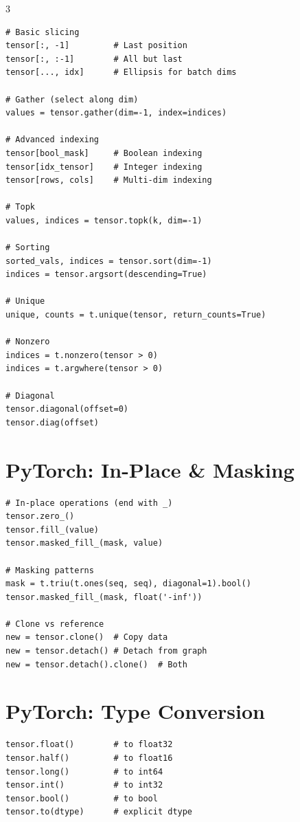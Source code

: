 \documentclass[10pt,a4paper,landscape]{article}
\begin{document}
\begin{multicols}{3}
\begin{lstlisting}
# Basic slicing
tensor[:, -1]         # Last position
tensor[:, :-1]        # All but last
tensor[..., idx]      # Ellipsis for batch dims

# Gather (select along dim)
values = tensor.gather(dim=-1, index=indices)

# Advanced indexing
tensor[bool_mask]     # Boolean indexing
tensor[idx_tensor]    # Integer indexing
tensor[rows, cols]    # Multi-dim indexing

# Topk
values, indices = tensor.topk(k, dim=-1)

# Sorting
sorted_vals, indices = tensor.sort(dim=-1)
indices = tensor.argsort(descending=True)

# Unique
unique, counts = t.unique(tensor, return_counts=True)

# Nonzero
indices = t.nonzero(tensor > 0)
indices = t.argwhere(tensor > 0)

# Diagonal
tensor.diagonal(offset=0)
tensor.diag(offset)
\end{lstlisting}

\section{PyTorch: In-Place \& Masking}

\begin{lstlisting}
# In-place operations (end with _)
tensor.zero_()
tensor.fill_(value)
tensor.masked_fill_(mask, value)

# Masking patterns
mask = t.triu(t.ones(seq, seq), diagonal=1).bool()
tensor.masked_fill_(mask, float('-inf'))

# Clone vs reference
new = tensor.clone()  # Copy data
new = tensor.detach() # Detach from graph
new = tensor.detach().clone()  # Both
\end{lstlisting}

\section{PyTorch: Type Conversion}

\begin{lstlisting}
tensor.float()        # to float32
tensor.half()         # to float16
tensor.long()         # to int64
tensor.int()          # to int32
tensor.bool()         # to bool
tensor.to(dtype)      # explicit dtype


\end{lstlisting}
\end{multicols}
\end{document}
